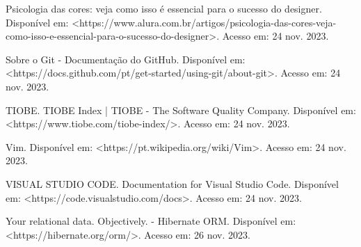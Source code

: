 \documentclass[a4paper,12pt]{article}
\begin{document}
\noindent Psicologia das cores: veja como isso é essencial para o sucesso do designer. 
Disponível em: <https://www.alura.com.br/artigos/psicologia-das-cores-veja-como-isso-e-essencial-para-o-sucesso-do-designer>.
Acesso em: 24 nov. 2023. \linebreak 

\noindent Sobre o Git - Documentação do GitHub. Disponível em: <https://docs.github.com/pt/get-started/using-git/about-git>. Acesso em: 24 nov. 2023. \linebreak

\noindent TIOBE. TIOBE Index | TIOBE - The Software Quality Company. Disponível em: <https://www.tiobe.com/tiobe-index/>. Acesso em: 24 nov. 2023. \linebreak

\noindent Vim. Disponível em: <https://pt.wikipedia.org/wiki/Vim>. Acesso em: 24 nov. 2023. \linebreak

\noindent VISUAL STUDIO CODE. Documentation for Visual Studio Code. Disponível em: <https://code.visualstudio.com/docs>. Acesso em: 24 nov. 2023. \linebreak

\noindent Your relational data. Objectively. - Hibernate ORM. Disponível em: <https://hibernate.org/orm/>. Acesso em: 26 nov. 2023. \linebreak

\noindent

\end{document}
